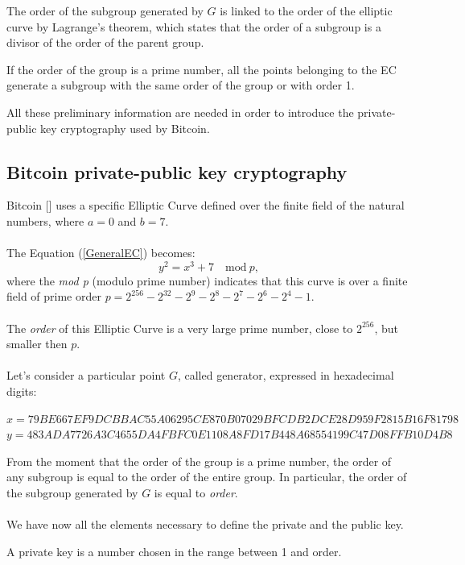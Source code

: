 \begin{remark}
	The order of the subgroup generated by $G$ is linked to the order of the elliptic curve by Lagrange's theorem, which states that the order of a subgroup is a divisor of the order of the parent group.
\end{remark}

\begin{remark}
	If the order of the group is a prime number, all the points belonging to the EC generate a subgroup with the same order of the group or with order 1.
\end{remark}
All these preliminary information are needed in order to introduce the private-public key cryptography used by Bitcoin.





\subsection{Bitcoin private-public key cryptography}

Bitcoin [\cite{11}] uses a specific Elliptic Curve defined over the finite field of the natural numbers, where $a=0$ and $b=7$.\\ \\
The Equation (\ref{GeneralEC}) becomes:
\begin{equation}\label{BitcoinEC}
y^2=x^3+7 \quad \textrm{mod} \ p,
\end{equation}
where the \textit{mod p} (modulo prime number) indicates that this curve is over a finite field of prime order $p=2^{256}-2^{32}-2^9-2^8-2^7-2^6-2^4-1$.
\\ \\
The \textit{order} of this Elliptic Curve is a very large prime number, close to $2^{256}$, but smaller then $p$. \\ \\
Let's consider a particular point $G$, called generator, expressed in hexadecimal digits:
\begin{center} 
	$ x=79BE667E F9DCBBAC 55A06295 CE870B07 029BFCDB 2DCE28D9 59F2815B 16F81798$\\
	$y=483ADA77 26A3C465 5DA4FBFC 0E1108A8 FD17B448 A6855419 9C47D08F FB10D4B8$
\end{center}
From the moment that the order of the group is a prime number, the order of any subgroup is equal to the order of the entire group. In particular, the order of the subgroup generated by $G$ is equal to \textit{order}.
\\ \\
We have now all the elements necessary to define the private and the public key.
\begin{definition}
	A private key is a number chosen in the range between 1 and order.
\end{definition}

